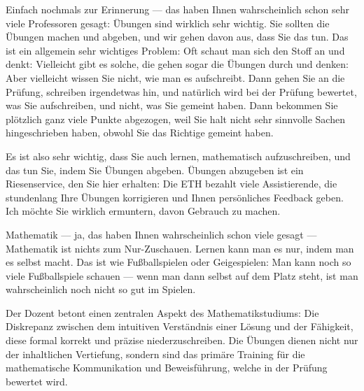 \begin{spoken-clean}[00:09:50 - 00:12:10]
Einfach nochmals zur Erinnerung --- das haben Ihnen wahrscheinlich schon sehr viele Professoren gesagt: Übungen sind wirklich sehr wichtig. Sie sollten die Übungen machen und abgeben, und wir gehen davon aus, dass Sie das tun. Das ist ein allgemein sehr wichtiges Problem: Oft schaut man sich den Stoff an und denkt:  Vielleicht gibt es solche, die gehen sogar die Übungen durch und denken:  Aber vielleicht wissen Sie nicht, wie man es aufschreibt. Dann gehen Sie an die Prüfung, schreiben irgendetwas hin, und natürlich wird bei der Prüfung bewertet, was Sie aufschreiben, und nicht, was Sie gemeint haben. Dann bekommen Sie plötzlich ganz viele Punkte abgezogen, weil Sie halt nicht sehr sinnvolle Sachen hingeschrieben haben, obwohl Sie das Richtige gemeint haben.

Es ist also sehr wichtig, dass Sie auch lernen, mathematisch aufzuschreiben, und das tun Sie, indem Sie Übungen abgeben. Übungen abzugeben ist ein Riesenservice, den Sie hier erhalten: Die ETH bezahlt viele Assistierende, die stundenlang Ihre Übungen korrigieren und Ihnen persönliches Feedback geben. Ich möchte Sie wirklich ermuntern, davon Gebrauch zu machen. 

Mathematik --- ja, das haben Ihnen wahrscheinlich schon viele gesagt --- Mathematik ist nichts zum Nur-Zuschauen. Lernen kann man es nur, indem man es selbst macht. Das ist wie Fußballspielen oder Geigespielen: Man kann noch so viele Fußballspiele schauen --- wenn man dann selbst auf dem Platz steht, ist man wahrscheinlich noch nicht so gut im Spielen.
\end{spoken-clean}

\begin{didactic-insight}
Der Dozent betont einen zentralen Aspekt des Mathematikstudiums: Die Diskrepanz zwischen dem intuitiven Verständnis einer Lösung und der Fähigkeit, diese formal korrekt und präzise niederzuschreiben. Die Übungen dienen nicht nur der inhaltlichen Vertiefung, sondern sind das primäre Training für die mathematische Kommunikation und Beweisführung, welche in der Prüfung bewertet wird.
\end{didactic-insight}

